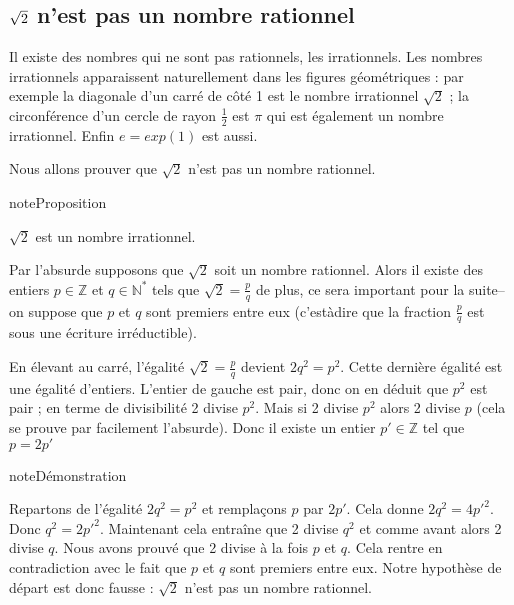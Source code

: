 \documentclass[letterpaper,10pt,french]{jupyterBook}
\begin{document}
\subsection{\protect\(\sqrt{2}\protect\) n’est pas un nombre rationnel}
\label{\detokenize{rationnels:sqrt-2-n-est-pas-un-nombre-rationnel}}
\sphinxAtStartPar
Il existe des nombres qui ne sont pas rationnels, les irrationnels. Les nombres irrationnels apparaissent naturellement
dans les figures géométriques : par exemple la diagonale d’un carré de côté 1 est le nombre irrationnel \(\sqrt{2}\) ; la
circonférence d’un cercle de rayon \(\frac{1}{2}\)
est \(\pi\) qui est également un nombre irrationnel. Enfin \(e = exp(1)\) est aussi.

\sphinxAtStartPar
Nous allons prouver que \(\sqrt{2}\) n’est pas un nombre rationnel.

\begin{sphinxadmonition}{note}{Proposition}

\sphinxAtStartPar
\(\sqrt{2}\) est un nombre irrationnel.
\end{sphinxadmonition}

\sphinxAtStartPar
Par l’absurde supposons que \(\sqrt{2}\) soit un nombre rationnel. Alors il existe des entiers \(p\in\mathbb{Z}\) et \(q\in \mathbb{N}^{*}\) tels que \(\sqrt{2}=\frac{p}{q}\)
de plus, ce sera important pour la suite– on suppose que \(p\) et \(q\) sont premiers entre eux (c’est\sphinxhyphen{}à\sphinxhyphen{}dire
que la fraction \(\frac{p}{q}\) est sous une écriture irréductible).

\sphinxAtStartPar
En élevant au carré, l’égalité \(\sqrt{2}=\frac{p}{q}\)
devient \(2q^2=p^2\). Cette dernière égalité est une égalité d’entiers. L’entier de
gauche est pair, donc on en déduit que \(p^2\)
est pair ; en terme de divisibilité 2 divise \(p^2\).
Mais si 2 divise \(p^2\)
alors 2 divise \(p\) (cela se prouve par facilement l’absurde). Donc il existe un entier \(p'\in \mathbb{Z}\) tel que \(p=2p'\)

\begin{sphinxadmonition}{note}{Démonstration}

\sphinxAtStartPar
Repartons de l’égalité \(2q^2=p^2\)
et remplaçons \(p\) par \(2p'.\) Cela donne \(2q^2=4p'^{2}\). Donc \(q^2=2p'^{2}.\)
Maintenant cela
entraîne que 2 divise \(q^2\)
et comme avant alors 2 divise \(q.\)
Nous avons prouvé que 2 divise à la fois \(p\) et \(q.\) Cela rentre en contradiction avec le fait que \(p\) et \(q\) sont premiers entre
eux. Notre hypothèse de départ est donc fausse : \(\sqrt{2}\) n’est pas un nombre rationnel.
\end{sphinxadmonition}
\end{document}
